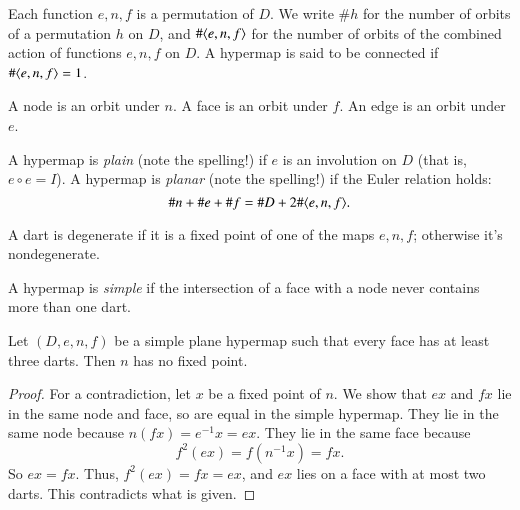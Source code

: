 Each function $e,n,f$ is a permutation of $D$.  
We write $\#h$ for the
number of orbits of a permutation $h$ on $D$, and $\#\langle e,n,f\rangle$
for the number of orbits of the combined action of functions $e,n,f$
on $D$.  A hypermap is said to be connected if 
  $\#\langle e,n,f\rangle = 1$.

\begin{definition}  A node is an orbit  under
$n$.  A face is an  orbit  under $f$.  An edge
is an orbit under $e$.
\end{definition}

\begin{definition} A hypermap is {\it plain} (note the spelling!) if
$e$ is an involution on $D$ (that is, $e\circ e = I$).  A hypermap
is {\it planar} (note the spelling!) if the Euler relation holds:
    $$\# n + \# e + \# f = \# D + 2 \#\langle e,n,f\rangle.$$
\end{definition}

\begin{definition} A dart is degenerate if it is a
fixed point of one of the maps $e,n,f$; otherwise it's nondegenerate.  
\end{definition}

\begin{definition} 
A hypermap is {\it simple} if the intersection of a face with
a node never contains more than one dart.
\end{definition}


\begin{lemma}\label{lemma:nondegen} 
Let $(D,e,n,f)$ be a simple plane hypermap such that every face has
at least three darts.
Then $n$ has no fixed point.
\end{lemma}

\begin{proof}  For a contradiction, let $x$ be a fixed point of
$n$. We show that $e x$ and $f x$ lie in the same node and
face, so are equal in the simple hypermap.  
They lie in the same node because
$n(f x) = e^{-1} x = e x$. They lie in the same face because
    $$f^2 (e x) =  f(n^{-1} x) = f x.$$
So $e x = f x$.   Thus, $f^2 (e x) = f x = e x$, and $e x$ lies on a
face with at most two darts.  This contradicts what is given.
\end{proof}

